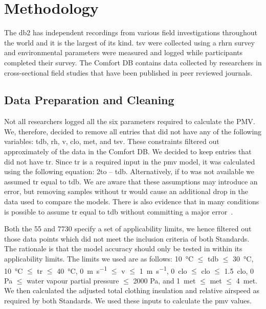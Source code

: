 

\section{Methodology}\label{sec:methodology}

The \gls{db2} has  independent recordings from various field investigations throughout the world and it is the largest of its kind.
\Ac{tsv} were collected using a \gls{rhrn} survey and environmental parameters were measured and logged while participants completed their survey.
The Comfort DB contains data collected by researchers in cross-sectional field studies that have been published in peer reviewed journals.

\subsection{Data Preparation and Cleaning}\label{subsec:data-processing-and-cleaning}
Not all researchers logged all the six parameters required to calculate the PMV.\@
We, therefore, decided to remove all entries that did not have any of the following variables: \ac{tdb}, \ac{rh}, \ac{v}, \ac{clo}, \ac{met}, and \ac{tsv}.
These constraints filtered out approximately  of the data in the Comfort DB.\@
We decided to keep entries that did not have \ac{tr}.
Since \ac{tr} is a required input in the \ac{pmv} model, it was calculated using the following equation: 2\ac{to} – \ac{tdb}.
Alternatively, if \ac{to} was not available we assumed \ac{tr} equal to \ac{tdb}.
We are aware that these assumptions may introduce an error, but removing samples without \ac{tr} would cause an additional  drop in the data used to compare the models.
There is also evidence that in many conditions is possible to assume \ac{tr} equal to \ac{tdb} without committing a major error~\cite{Dawe2020}.

Both the \gls{55} and \gls{7730} specify a set of applicability limits, we hence filtered out those data points which did not meet the inclusion criteria of both Standards.
The rationale is that the model accuracy should only be tested in within its applicability limits.
The limits we used are as follows: \qty{10}{\celsius} $\leq$ \ac{tdb} $\leq$ \qty{30}{\celsius}, \qty{10}{\celsius} $\leq$ \ac{tr} $\leq$ \qty{40}{\celsius}, \qty{0}{\m\per\s} $\leq$ \ac{v} $\leq$ \qty{1}{\m\per\s}, \qty{0}{clo} $\leq$ \ac{clo} $\leq$ \qty{1.5}{clo}, 0 Pa $\leq$ water vapour partial pressure $\leq$ 2000 Pa, and \qty{1}{met} $\leq$ \ac{met} $\leq$ \qty{4}{met}.
We then calculated the adjusted total clothing insulation and relative airspeed as required by both Standards.
We used these inputs to calculate the \ac{pmv} values.  %

